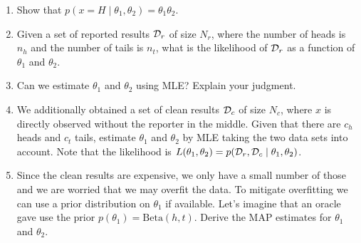\documentclass{article}
\theoremstyle{plain}
\theoremstyle{definition}
\begin{document}
\begin{enumerate}
  \setcounter{enumi}{\value{saveenum}}
\item Show that $p(x=H\mid \theta_1, \theta_2) = \theta_1 \theta_2$.


\item Given a set of reported results $\mathcal{D}_r$ of size $N_r$, where the number of heads is $n_h$ and the number of tails is $n_t$, what is the likelihood of $\mathcal{D}_r$ as a function of $\theta_1$ and $\theta_2$.


\item Can we estimate $\theta_1$ and $\theta_2$ using MLE? Explain your judgment.


\item We additionally obtained a set of clean results $\mathcal{D}_c$ of size $N_c$, where $x$ is directly observed without the reporter in the middle. Given that there are $c_h$ heads and $c_t$ tails,
estimate $\theta_1$ and $\theta_2$ by MLE taking the two data sets into account.
Note that the likelihood is $L(\theta_1, \theta_2) = p(\mathcal{D}_r, \mathcal{D}_c\mid \theta_1, \theta_2)$.

\item Since the clean results are expensive, we only have a small number of those and we are worried that we may overfit the data.
To mitigate overfitting we can use a prior distribution on $\theta_1$ if available. Let's imagine that an oracle gave use the prior $p(\theta_1) = \text{Beta}(h, t)$.
Derive the MAP estimates for $\theta_1$ and $\theta_2$.

\setcounter{saveenum}{\value{enumi}}
\end{enumerate}
\end{document}
